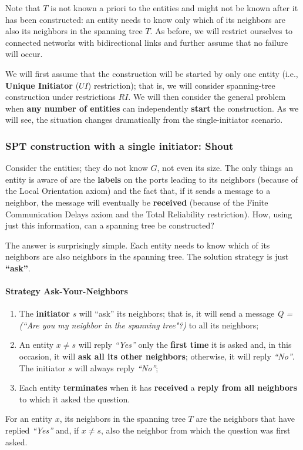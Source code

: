 Note that $T$ is not known a priori to the entities and might not be known after it has been constructed: an entity needs to know only which of its neighbors are also its neighbors in the spanning tree $T$. As before, we will restrict ourselves to connected networks with bidirectional links and further assume that no failure will occur.

We will first assume that the construction will be started by only one entity (i.e., \textbf{Unique Initiator} ($UI$) restriction); that is, we will consider spanning-tree construction under restrictions $RI$. We will then consider the general problem when \textbf{any number of entities} can independently \textbf{start} the construction. As we will see, the situation changes dramatically from the single-initiator scenario.

\subsubsection{SPT construction with a single initiator: Shout}

Consider the entities; they do not know $G$, not even its size. The only things an entity is aware of are the \textbf{labels} on the ports leading to its neighbors (because of the Local Orientation axiom) and the fact that, if it sends a message to a neighbor, the message will eventually be \textbf{received} (because of the Finite Communication Delays axiom and the Total Reliability restriction). How, using just this information, can a spanning tree be constructed? 

The answer is surprisingly simple. Each entity needs to know which of its neighbors are also neighbors in the spanning tree. The solution strategy is just \textbf{“ask”}.

\paragraph{Strategy Ask-Your-Neighbors}

\begin{enumerate}
    \item The \textbf{initiator} $s$ will “ask” its neighbors; that is, it will send a message \textit{Q = (“Are you my neighbor in the spanning tree"?)} to all its neighbors;
    \item An entity $x \neq s$ will reply \textit{“Yes”} only the \textbf{first time} it is asked and, in this occasion, it will \textbf{ask all its other neighbors}; otherwise, it will reply \textit{“No”}. The initiator $s$ will always reply \textit{“No”};
    \item Each entity \textbf{terminates} when it has \textbf{received} a \textbf{reply from all neighbors} to which it asked the question.
\end{enumerate}
For an entity $x$, its neighbors in the spanning tree $T$ are the neighbors that have replied \textit{“Yes”} and, if $x \neq s$, also the neighbor from which the question was first asked.

